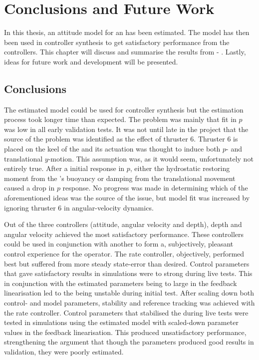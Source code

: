 \chapter{Conclusions and Future Work}\label{cha:conclusions}
In this thesis, an attitude model for an \abbrROV has been estimated. The model has then been used in controller synthesis to get satisfactory performance from the controllers. This chapter will discuss and summarise the results from  - . 
Lastly, ideas for future work and development will be presented.

\section{Conclusions}
The estimated model could be used for controller synthesis but the estimation process took longer time than expected. The problem was mainly that fit in $p$ was low in all early validation tests. It was not until late in the project that the source of the problem was identified as the effect of thruster 6. Thruster 6 is  placed on the keel of the \abbrROV and its actuation was thought to induce both $p$- and translational $y$-motion. This assumption was, as it would seem, unfortunately not entirely true. After a initial response in $p$, either the hydrostatic restoring moment from the \abbrROV's buoyancy or damping from the translational movement caused a drop in $p$ response. No progress was made in determining which of the aforementioned ideas was the source of the issue, but model fit was increased by ignoring thruster 6 in angular-velocity dynamics.  

Out of the three controllers (attitude, angular velocity and depth), depth and angular velocity achieved the most satisfactory performance. These controllers could be used in conjunction with another to form a, subjectively, pleasant control experience for the operator. The rate controller, objectively, performed best but suffered from more steady state-error than desired. Control parameters that gave satisfactory results in simulations were to strong during live tests. This in conjunction with the estimated parameters being to large in the feedback linearisation led to the \abbrROV being unstable during initial test. After scaling down both control- and model parameters, stability and reference tracking was achieved with the rate controller. Control parameters that stabilised the \abbrROV during live tests were tested in simulations using the estimated model with scaled-down parameter values in the feedback linearisation. This produced unsatisfactory performance, strengthening the argument that though the parameters produced good results in validation, they were poorly estimated.

